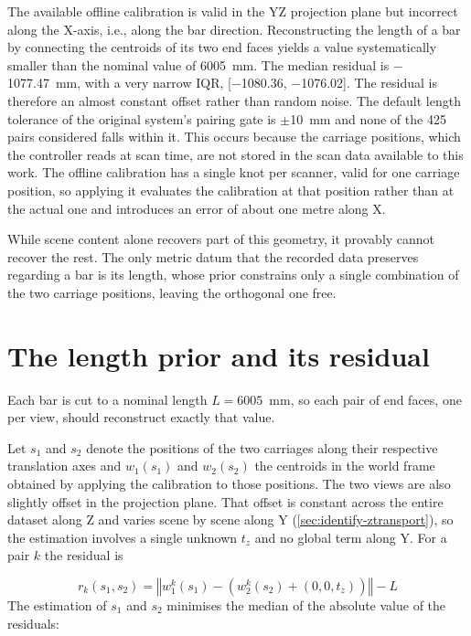 \documentclass[a4paper, 12pt, twoside]{book}
\begin{document}
The available offline calibration is valid in the YZ projection plane but incorrect along the X-axis, i.e., along the bar direction. Reconstructing the length of a bar by connecting the centroids of its two end faces yields a value systematically smaller than the nominal value of 6005~mm. The median residual is $-$1077.47~mm, with a very narrow IQR, [$-$1080.36, $-$1076.02]. The residual is therefore an almost constant offset rather than random noise. The default length tolerance of the original system's pairing gate is $\pm$10~mm and none of the 425 pairs considered falls within it.
This occurs because the carriage positions, which the controller reads at scan time, are not stored in the scan data available to this work. The offline calibration has a single knot per scanner, valid for one carriage position, so applying it evaluates the calibration at that position rather than at the actual one and introduces an error of about one metre along X.

While scene content alone recovers part of this geometry, it provably cannot recover the rest. The only metric datum that the recorded data preserves regarding a bar is its length, whose prior constrains only a single combination of the two carriage positions, leaving the orthogonal one free.

\section{The length prior and its residual}
\label{sec:identify-length}

Each bar is cut to a nominal length $L = 6005$~mm, so each pair of end faces, one per view, should reconstruct exactly that value.

Let $s_1$ and $s_2$ denote the positions of the two carriages along their respective translation axes and $w_1(s_1)$ and $w_2(s_2)$ the centroids in the world frame obtained by applying the calibration to those positions. The two views are also slightly offset in the projection plane. That offset is constant across the entire dataset along Z and varies scene by scene along Y (\cref{sec:identify-ztransport}), so the estimation involves a single unknown $t_z$ and no global term along Y. For a pair $k$ the residual is

\begin{equation}
r_k(s_1, s_2) = \left\Vert{} w_1^k(s_1) - \left( w_2^k(s_2) + (0, 0, t_z) \right) \right\Vert{} - L
\label{eq:residual}
\end{equation}
\newpage
The estimation of $s_1$ and $s_2$ minimises the median of the absolute value of the residuals:
\end{document}
